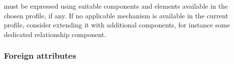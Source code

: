 must be expressed using suitable components and elements available in the chosen profile, if any. If no applicable mechanism is available in the current profile, consider extending it with additional components, for instance some dedicated relationship component.

\subsubsection{Foreign attributes}\label{foreign-attributes}

